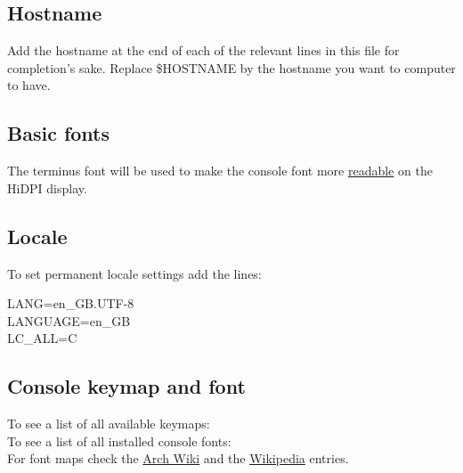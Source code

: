 \subsection{Hostname}

\begin{blocksection}
    Add the hostname at the end of each of the relevant lines in this file for completion's sake. Replace \textcolor{codekeyword1}{\$HOSTNAME} by the hostname you want to computer to have.
\end{blocksection}

\subsection{Basic fonts}

\begin{blocksection}
    The terminus font will be used to make the console font more \href{https://wiki.archlinux.org/index.php/HiDPI#Linux_console}{readable} on the HiDPI display.
\end{blocksection}

\subsection{Locale}

\begin{blocksection}
    To set permanent locale settings add the lines:\\
    \begin{codeblock}
        LANG=en\_GB.UTF-8\\
        LANGUAGE=en\_GB\\
        LC\_ALL=C
    \end{codeblock}
\end{blocksection}

\subsection{Console keymap and font}

To see a list of all available keymaps: \\
To see a list of all installed console fonts: \\
For font maps check the \href{https://wiki.archlinux.org/index.php/fonts#Persistent_configuration}{Arch Wiki} and the \href{https://en.wikipedia.org/wiki/ISO/IEC_8859#The_parts_of_ISO/IEC_8859}{Wikipedia} entries.

